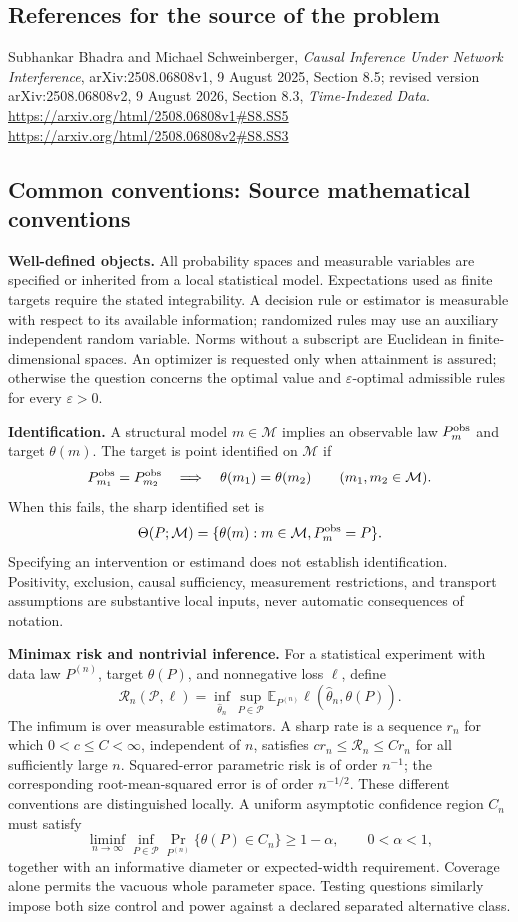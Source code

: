 \documentclass[11pt,a4paper]{article}
\newcommand{\E}{\mathbb E}
\begin{document}
\subsection*{References for the source of the problem}
Subhankar Bhadra and Michael Schweinberger, \emph{Causal Inference Under Network Interference}, arXiv:2508.06808v1, 9 August 2025, Section 8.5; revised version arXiv:2508.06808v2, 9 August 2026, Section 8.3, \emph{Time-Indexed Data}.
\url{https://arxiv.org/html/2508.06808v1#S8.SS5}
\url{https://arxiv.org/html/2508.06808v2#S8.SS3}

\subsection*{Common conventions: Source mathematical conventions}

\textbf{Well-defined objects.}
All probability spaces and measurable variables are specified or inherited
from a local statistical model. Expectations used as finite targets require
the stated integrability. A decision rule or estimator is measurable with
respect to its available information; randomized rules may use an auxiliary
independent random variable. Norms without a subscript are Euclidean in
finite-dimensional spaces. An optimizer is requested only when attainment
is assured; otherwise the question concerns the optimal value and
$\varepsilon$-optimal admissible rules for every $\varepsilon>0$.

\textbf{Identification.}
A structural model $m\in\mathcal M$ implies an observable law
$P_m^{\rm obs}$ and target $\theta(m)$. The target is point identified on
$\mathcal M$ if
\[
 P_{m_1}^{\rm obs}=P_{m_2}^{\rm obs}
 \quad\Longrightarrow\quad\theta(m_1)=\theta(m_2)
 \qquad(m_1,m_2\in\mathcal M).
\]
When this fails, the sharp identified set is
\[
 \Theta(P;\mathcal M)=\{\theta(m):m\in\mathcal M,
                                  P_m^{\rm obs}=P\}.
\]
Specifying an intervention or estimand does not establish identification.
Positivity, exclusion, causal sufficiency, measurement restrictions, and
transport assumptions are substantive local inputs, never automatic
consequences of notation.

\textbf{Minimax risk and nontrivial inference.}
For a statistical experiment with data law $P^{(n)}$, target $\theta(P)$,
and nonnegative loss $\ell$, define
\[
 \mathcal R_n(\mathcal P,\ell)
   =\inf_{\widehat\theta_n}\sup_{P\in\mathcal P}
      \E_{P^{(n)}}\ell(\widehat\theta_n,\theta(P)).
\]
The infimum is over measurable estimators. A sharp rate is a sequence
$r_n$ for which $0<c\leq C<\infty$, independent of $n$, satisfies
$c r_n\leq\mathcal R_n\leq C r_n$ for all sufficiently large $n$.
Squared-error parametric risk is of order $n^{-1}$; the corresponding
root-mean-squared error is of order $n^{-1/2}$. These different conventions
are distinguished locally. A uniform asymptotic confidence region $C_n$
must satisfy
\[
 \liminf_{n\to\infty}\inf_{P\in\mathcal P}
     \Pr_{P^{(n)}}\{\theta(P)\in C_n\}\geq 1-\alpha,
 \qquad 0<\alpha<1,
\]
together with an informative diameter or expected-width requirement.
Coverage alone permits the vacuous whole parameter space. Testing questions
similarly impose both size control and power against a declared separated
alternative class.
\end{document}
